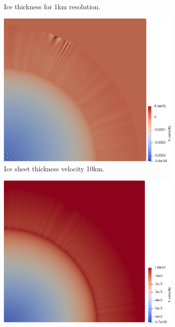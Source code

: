 \documentclass{article}
\begin{document}
\begin{figure}[!h]
\begin{minipage}[t]{.25\textwidth}
\begin{subfigure}{\textwidth}
		\caption{Ice thickness for 1km resolution.}
		\label{h1km}
	    \end{subfigure}
	\end{minipage}\hfil
	\begin{minipage}[t]{.25\textwidth}
		\begin{subfigure}{\textwidth}
			\includegraphics[width=\linewidth]{../fig/hvelocity_10km_quarter.png}
			\caption{Ice sheet thickness velocity 10km.}
			\label{hvelocity10km}
		\end{subfigure}\hfil %
		\begin{subfigure}{\textwidth}
			\includegraphics[width=\linewidth]{../fig/hvelocity_5km_quarter.png}

\end{subfigure}
\end{minipage}
\end{figure}
\end{document}
